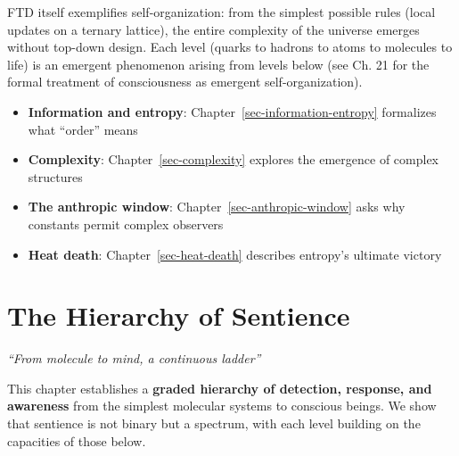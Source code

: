 \documentclass[
  11pt,
  letterpaper,
  twoside,
  openright]{book}
\providecommand{\tightlist}{%
  \setlength{\itemsep}{0pt}\setlength{\parskip}{0pt}}
\begin{document}
FTD itself exemplifies self-organization: from the simplest possible
rules (local updates on a ternary lattice), the entire complexity of the
universe emerges without top-down design. Each level (quarks to hadrons
to atoms to molecules to life) is an emergent phenomenon arising from
levels below (see Ch. 21 for the formal treatment of consciousness as
emergent self-organization).

\begin{tcolorbox}[enhanced jigsaw, coltitle=black, colbacktitle=quarto-callout-tip-color!10!white, toprule=.15mm, colframe=quarto-callout-tip-color-frame, arc=.35mm, opacityback=0, bottomtitle=1mm, toptitle=1mm, breakable, colback=white, titlerule=0mm, opacitybacktitle=0.6, title=\textcolor{quarto-callout-tip-color}{\faLightbulb}\hspace{0.5em}{Related Topics}, rightrule=.15mm, bottomrule=.15mm, leftrule=.75mm, left=2mm]

\begin{itemize}
\tightlist
\item
  \textbf{Information and entropy}:
  Chapter~\ref{sec-information-entropy} formalizes what ``order'' means
\item
  \textbf{Complexity}: Chapter~\ref{sec-complexity} explores the
  emergence of complex structures
\item
  \textbf{The anthropic window}: Chapter~\ref{sec-anthropic-window} asks
  why constants permit complex observers
\item
  \textbf{Heat death}: Chapter~\ref{sec-heat-death} describes entropy's
  ultimate victory
\end{itemize}

\end{tcolorbox}

\chapter{The Hierarchy of Sentience}\label{sec-hierarchy-sentience}

\emph{``From molecule to mind, a continuous ladder''}

\begin{tcolorbox}[enhanced jigsaw, coltitle=black, colbacktitle=quarto-callout-note-color!10!white, toprule=.15mm, colframe=quarto-callout-note-color-frame, arc=.35mm, opacityback=0, bottomtitle=1mm, toptitle=1mm, breakable, colback=white, titlerule=0mm, opacitybacktitle=0.6, title=\textcolor{quarto-callout-note-color}{\faInfo}\hspace{0.5em}{Purpose of This Chapter}, rightrule=.15mm, bottomrule=.15mm, leftrule=.75mm, left=2mm]

This chapter establishes a \textbf{graded hierarchy of detection,
response, and awareness} from the simplest molecular systems to
conscious beings. We show that sentience is not binary but a spectrum,
with each level building on the capacities of those below.

\end{tcolorbox}
\end{document}
